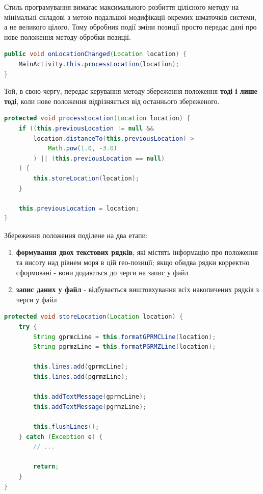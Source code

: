 \documentclass[simple,a4paper,14pt,ukrainian,utf8]{eskdtext}
\begin{document}
        	Стиль програмування вимагає максимального розбиття цілісного методу на мінімальні складові з метою подальшої модифікації окремих шматочків системи, а не великого цілого. Тому обробник події зміни позиції просто передає дані про нове положення методу обробки позиції.
        	
\begin{lstlisting}[language=Java]
public void onLocationChanged(Location location) {
	MainActivity.this.processLocation(location);
}
\end{lstlisting}

			Той, в свою чергу, передає керування методу збереження положення \textbf{тоді і лише тоді}, коли нове положення відрізняється від останнього збереженого.
			
\begin{lstlisting}[language=Java]
protected void processLocation(Location location) {
    if ((this.previousLocation != null && 
    	location.distanceTo(this.previousLocation) > 
    		Math.pow(1.0, -3.0)
    	) || (this.previousLocation == null)
   	) {
        this.storeLocation(location);
    }

    this.previousLocation = location;
}
\end{lstlisting}

			Збереження положення поділене на два етапи:
			
			\begin{enumerate}
				\item \textbf{формування двох текстових рядків}, які містять інформацію про положення та висоту над рівнем моря в цій гео-позиції; якщо обидва рядки корректно сформовані - вони додаються до черги на запис у файл
				\item \textbf{запис даних у файл} - відбувається виштовхування всіх накопичених рядків з черги у файл
			\end{enumerate}
			
\begin{lstlisting}[language=Java]
protected void storeLocation(Location location) {
    try {
        String gprmcLine = this.formatGPRMCLine(location);
        String pgrmzLine = this.formatPGRMZLine(location);

        this.lines.add(gprmcLine);
        this.lines.add(pgrmzLine);

        this.addTextMessage(gprmcLine);
        this.addTextMessage(pgrmzLine);

        this.flushLines();
    } catch (Exception e) {
        // ...

        return;
    }
}
\end{lstlisting}
        	
\end{document}
